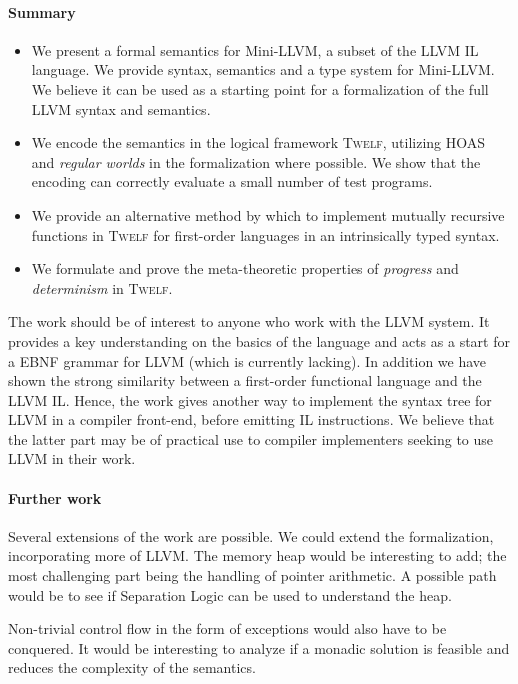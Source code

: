 \documentclass[a4paper, oneside, 10pt, draft]{memoir}
\newcommand{\twelf}{\textsc{Twelf}}
\begin{document}
\paragraph{Summary}
\begin{itemize}
\item We present a formal semantics for Mini-LLVM, a subset of the
  LLVM IL language. We provide syntax, semantics and a type system for
  Mini-LLVM. We believe it can be used as a starting point for a
  formalization of the full LLVM syntax and semantics.
\item We encode the semantics in the logical framework \twelf{},
  utilizing HOAS and \emph{regular worlds} in the formalization where
  possible. We show that the encoding can correctly evaluate a small
  number of test programs.
\item We provide an alternative method by which to implement mutually
  recursive functions in \twelf{} for first-order languages in an
  intrinsically typed syntax.
\item We formulate and prove the meta-theoretic properties of
  \emph{progress} and \emph{determinism} in \twelf{}.
\end{itemize}

The work should be of interest to anyone who work with the LLVM
system. It provides a key understanding on the basics of the language
and acts as a start for a EBNF grammar for LLVM (which is currently
lacking). In addition we have shown the strong similarity between a
first-order functional language and the LLVM IL. Hence, the work gives
another way to implement the syntax tree for LLVM in a compiler
front-end, before emitting IL instructions. We believe that the latter
part may be of practical use to compiler implementers seeking to use
LLVM in their work.

\paragraph{Further work}

Several extensions of the work are possible. We could extend the
formalization, incorporating more of LLVM. The memory heap would be
interesting to add; the most challenging part being the handling of
pointer arithmetic. A possible path would be to see if Separation
Logic\cite{reynolds:2002:separationlogic} can be used to understand
the heap.

Non-trivial control flow in the form of exceptions would also have to
be conquered. It would be interesting to analyze if a monadic solution
is feasible and reduces the complexity of the semantics.
\end{document}
